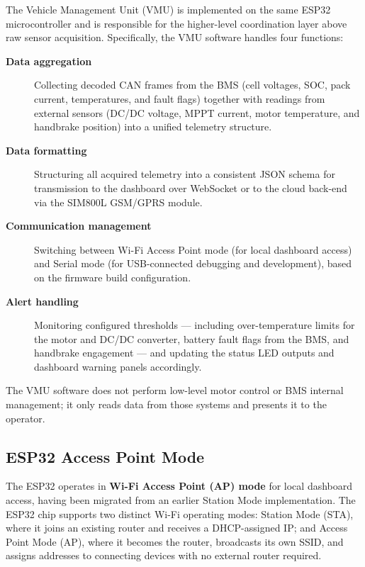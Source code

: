The Vehicle Management Unit (VMU) is implemented on the same ESP32 microcontroller and is responsible for the higher-level coordination layer above raw sensor acquisition. Specifically, the VMU software handles four functions:

\begin{description}
    \item[\textbf{Data aggregation}] Collecting decoded CAN frames from the BMS (cell voltages, SOC, pack current, temperatures, and fault flags) together with readings from external sensors (DC/DC voltage, MPPT current, motor temperature, and handbrake position) into a unified telemetry structure.

    \item[\textbf{Data formatting}] Structuring all acquired telemetry into a consistent JSON schema for transmission to the dashboard over WebSocket or to the cloud back-end via the SIM800L GSM/GPRS module.

    \item[\textbf{Communication management}] Switching between Wi-Fi Access Point mode (for local dashboard access) and Serial mode (for USB-connected debugging and development), based on the firmware build configuration.

    \item[\textbf{Alert handling}] Monitoring configured thresholds --- including over-temperature limits for the motor and DC/DC converter, battery fault flags from the BMS, and handbrake engagement --- and updating the status LED outputs and dashboard warning panels accordingly.
\end{description}

The VMU software does not perform low-level motor control or BMS internal management; it only reads data from those systems and presents it to the operator.

\subsection{ESP32 Access Point Mode}

The ESP32 operates in \textbf{Wi-Fi Access Point (AP) mode} for local dashboard access, having been migrated from an earlier Station Mode implementation. The ESP32 chip supports two distinct Wi-Fi operating modes: Station Mode (STA), where it joins an existing router and receives a DHCP-assigned IP; and Access Point Mode (AP), where it becomes the router, broadcasts its own SSID, and assigns addresses to connecting devices with no external router required.

